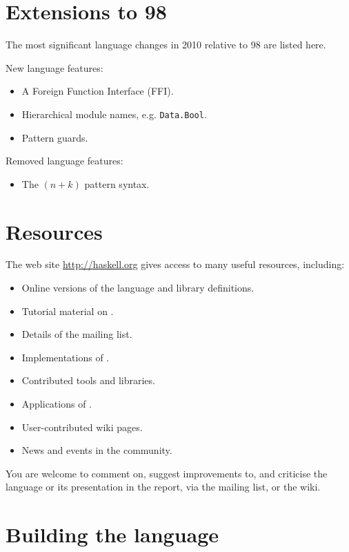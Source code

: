 \section*{Extensions to \Haskell{} 98}

\begin{haskellprime}
The most significant language changes in \Haskell{} 2010 relative to
\Haskell{} 98 are listed here.

New language features:
\begin{itemize}
\item A Foreign Function Interface (FFI).
\item Hierarchical module names, e.g. \mbox{\tt Data.Bool}.
\item Pattern guards.
\end{itemize}

Removed language features:
\begin{itemize}
\item The $(n+k)$ pattern syntax.
\end{itemize}

\end{haskellprime}

\section*{\Haskell{} Resources}
\label{sect:resources}

The \Haskell{} web site \url{http://haskell.org} gives access to many useful resources, including:
\begin{itemize}
\item Online versions of the language and library definitions.
\item Tutorial material on \Haskell{}.
\item Details of the \Haskell{} mailing list.
\item Implementations of \Haskell{}.
\item Contributed \Haskell{} tools and libraries.
\item Applications of \Haskell{}.
\item User-contributed wiki pages.
\item News and events in the \Haskell{} community.
\end{itemize}
You are welcome to comment on, suggest improvements to, and criticise
the language or its presentation in the report, via the \Haskell{}
mailing list, or the \Haskell{} wiki.

\section*{Building the language}

